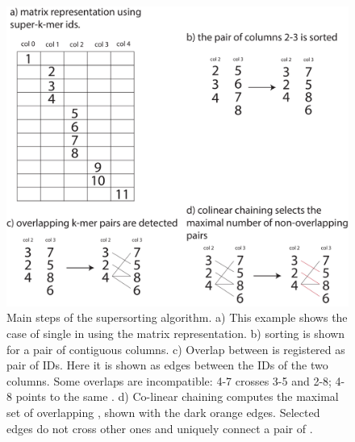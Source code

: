 \begin{figure}[h!]
	\centering
	\includegraphics[width=\textwidth]{figures/kmer_methods/sk_alg_export.pdf}
	\caption[Main steps of the super\kmer sorting algorithm.]{Main steps of the super\kmer sorting algorithm. a) This example shows the case of single \kmers in \skmers using the matrix representation. b) sorting is shown for a pair of contiguous columns. c) Overlap between \kmers is registered as pair of \skmer IDs. Here it is shown as edges between the \skmer IDs of the two columns. Some overlaps are incompatible: 4-7 crosses 3-5 and 2-8; 4-8 points to the same \kmer. d) Co-linear chaining computes the maximal set of overlapping \kmer, shown with the dark orange edges. Selected edges do not cross other ones and uniquely connect a pair of \kmers. }
	\label{fig:chain}
\end{figure}

